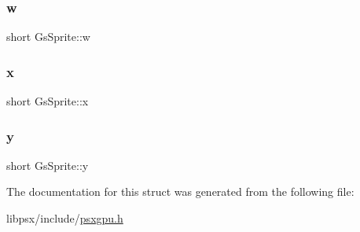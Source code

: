 \subsubsection{\texorpdfstring{w}{w}}
{\footnotesize\ttfamily short Gs\+Sprite\+::w}

\mbox{\label{structGsSprite_a1c067283cdc61f263e5b7e45ff714d4d}} 
\subsubsection{\texorpdfstring{x}{x}}
{\footnotesize\ttfamily short Gs\+Sprite\+::x}

\mbox{\label{structGsSprite_af747b4473fd4a9616a2da218cf313c61}} 
\subsubsection{\texorpdfstring{y}{y}}
{\footnotesize\ttfamily short Gs\+Sprite\+::y}



The documentation for this struct was generated from the following file\+:\begin{DoxyCompactItemize}
\item 
libpsx/include/\hyperlink{psxgpu_8h}{psxgpu.\+h}\end{DoxyCompactItemize}
